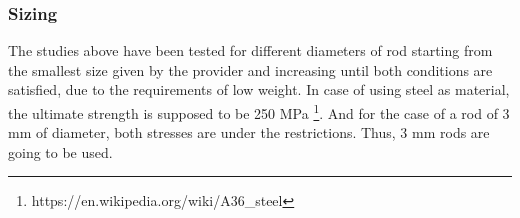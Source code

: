   \subsubsection{Sizing} %
  \label{ssub:sizing}
  The studies above have been tested for different diameters of rod starting from the smallest size given by the provider and increasing until both conditions are satisfied, due to the requirements of low weight.
  In case of using steel as material, the ultimate strength is supposed to be 250 MPa \footnote{https://en.wikipedia.org/wiki/A36_steel}.
  And for the case of a rod of 3 mm of diameter, both stresses are under the restrictions.
  Thus, 3 mm rods are going to be used.
